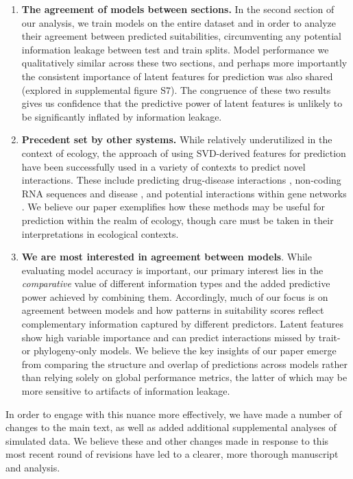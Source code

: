 \documentclass{article}
\begin{document}
\begin{enumerate}
    \item \textbf{The agreement of models between sections.} In the second section of our analysis, we train models on the entire dataset and in order to analyze their agreement between predicted suitabilities, circumventing any potential information leakage between test and train splits. Model performance we qualitatively similar across these two sections, and perhaps more importantly the consistent importance of latent features for prediction was also shared (explored in supplemental figure S7). The congruence of these two results gives us confidence that the predictive power of latent features is unlikely to be significantly inflated by information leakage. 
    
    \item \textbf{Precedent set by other systems.} While relatively underutilized in the context of ecology, the approach of using SVD-derived features for prediction have been successfully used in a variety of contexts to predict novel interactions. These include predicting drug-disease interactions \cite{wu2019prediction}, non-coding RNA sequences and disease \cite{zeng2020sdlda}, and potential interactions within gene networks \cite{yeung2002reverse}. We believe our paper exemplifies how these methods may be useful for prediction within the realm of ecology, though care must be taken in their interpretations in ecological contexts. 
    
    \item \textbf{We are most interested in agreement between models}. While evaluating model accuracy is important, our primary interest lies in the \emph{comparative} value of different information types and the added predictive power achieved by combining them. Accordingly, much of our focus is on agreement between models and how patterns in suitability scores reflect complementary information captured by different predictors. Latent features show high variable importance and can predict interactions missed by trait- or phylogeny-only models. We believe the key insights of our paper emerge from comparing the structure and overlap of predictions across models rather than relying solely on global performance metrics, the latter of which may be more sensitive to artifacts of information leakage. 
\end{enumerate}


In order to engage with this nuance more effectively, we have made a number of changes to the main text, as well as added additional supplemental analyses of simulated data. We believe these and other changes made in response to this most recent round of revisions have led to a clearer, more thorough manuscript and analysis. 
\end{document}
